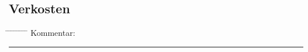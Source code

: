 \documentclass[12pt,oneside,a4paper]{scrartcl}
\begin{document}
{\subsection*{Verkosten}
\begin{tabbing}
	\hspace{1cm} \= \hspace{1cm} \= \hspace{1cm} \= \hspace{1cm} \= \hspace{1cm} \= \hspace{1cm} \= \hspace{1cm} \= \hspace{1cm} \= \kill
	\> Kommentar: \>\>\> \\
	\> \>  \rule[-0.2cm]{15.3cm}{1pt}\\
\end{tabbing}}
\end{document}
